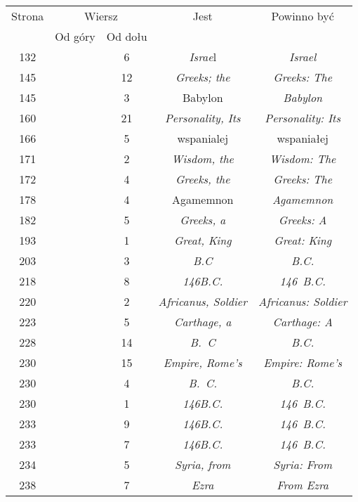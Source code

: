 \documentclass[a4paper,11pt]{article}
\numberwithin{equation}{section}
\begin{document}
\begin{center}
  \begin{tabular}{|c|c|c|c|c|}
    \hline
    Strona & \multicolumn{2}{c|}{Wiersz} & Jest
                              & Powinno być \\ \cline{2-3}
    & Od góry & Od dołu & & \\
    \hline
    132 & & \hphantom{0}6 & \textit{Israe}l & \textit{Israel} \\
    145 & & 12 & \textit{Greeks; the} & \textit{Greeks: The} \\
    145 & & \hphantom{0}3 & Babylon & \textit{Babylon} \\
    160 & & 21 & \textit{Personality, Its} & \textit{Personality: Its} \\
    166 & & \hphantom{0}5 & wspanialej & wspaniałej \\
    171 & & \hphantom{0}2 & \textit{Wisdom, the} & \textit{Wisdom: The} \\
    172 & & \hphantom{0}4 & \textit{Greeks, the} & \textit{Greeks: The} \\
    178 & & \hphantom{0}4 & Agamemnon & \textit{Agamemnon} \\
    182 & & \hphantom{0}5 & \textit{Greeks, a} & \textit{Greeks: A} \\
    193 & & \hphantom{0}1 & \textit{Great, King} & \textit{Great: King} \\
    203 & & \hphantom{0}3 & \textit{B.C} & \textit{B.C.} \\
    218 & & \hphantom{0}8 & \textit{146B.C.} & \textit{146~B.C.} \\
    220 & & \hphantom{0}2 & \textit{Africanus, Soldier}
           & \textit{Africanus: Soldier} \\
    223 & & \hphantom{0}5 & \textit{Carthage, a} & \textit{Carthage: A} \\
    228 & & 14 & \textit{B.~C} & \textit{B.C.} \\
    230 & & 15 & \textit{Empire, Rome's} & \textit{Empire: Rome's} \\
    230 & & \hphantom{0}4 & \textit{B.~C.} & \textit{B.C.} \\
    230 & & \hphantom{0}1 & \textit{146B.C.} & \textit{146~B.C.} \\
    233 & & \hphantom{0}9 & \textit{146B.C.} & \textit{146~B.C.} \\
    233 & & \hphantom{0}7 & \textit{146B.C.} & \textit{146~B.C.} \\
    234 & & \hphantom{0}5 & \textit{Syria, from} & \textit{Syria: From} \\
    238 & & \hphantom{0}7 & \textit{Ezra} & \textit{From Ezra} \\

\end{tabular}
\end{center}
\end{document}
